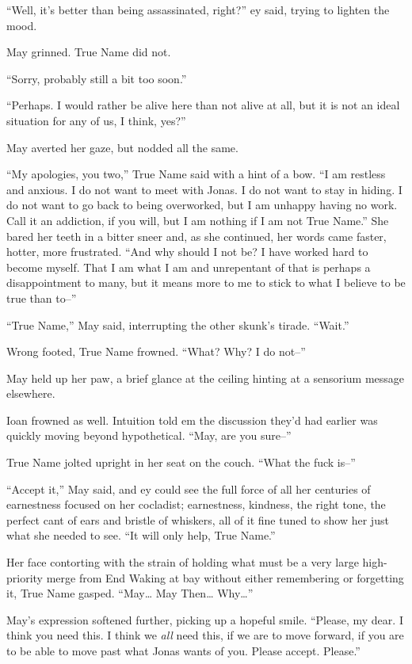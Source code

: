 ``Well, it's better than being assassinated, right?'' ey said, trying to lighten the mood.

May grinned. True Name did not.

``Sorry, probably still a bit too soon.''

``Perhaps. I would rather be alive here than not alive at all, but it is not an ideal situation for any of us, I think, yes?''

May averted her gaze, but nodded all the same.

``My apologies, you two,'' True Name said with a hint of a bow. ``I am restless and anxious. I do not want to meet with Jonas. I do not want to stay in hiding. I do not want to go back to being overworked, but I am unhappy having no work. Call it an addiction, if you will, but I am nothing if I am not True Name.'' She bared her teeth in a bitter sneer and, as she continued, her words came faster, hotter, more frustrated. ``And why should I not be? I have worked hard to become myself. That I am what I am and unrepentant of that is perhaps a disappointment to many, but it means more to me to stick to what I believe to be true than to--''

``True Name,'' May said, interrupting the other skunk's tirade. ``Wait.''

Wrong footed, True Name frowned. ``What? Why? I do not--''

May held up her paw, a brief glance at the ceiling hinting at a sensorium message elsewhere.

Ioan frowned as well. Intuition told em the discussion they'd had earlier was quickly moving beyond hypothetical. ``May, are you sure--''

True Name jolted upright in her seat on the couch. ``What the fuck is--''

``Accept it,'' May said, and ey could see the full force of all her centuries of earnestness focused on her cocladist; earnestness, kindness, the right tone, the perfect cant of ears and bristle of whiskers, all of it fine tuned to show her just what she needed to see. ``It will only help, True Name.''

Her face contorting with the strain of holding what must be a very large high-priority merge from End Waking at bay without either remembering or forgetting it, True Name gasped. ``May\ldots{} May Then\ldots{} Why\ldots{}''

May's expression softened further, picking up a hopeful smile. ``Please, my dear. I think you need this. I think we \emph{all} need this, if we are to move forward, if you are to be able to move past what Jonas wants of you. Please accept. Please.''

